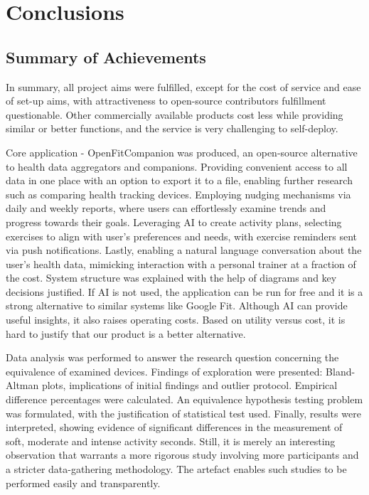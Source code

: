 \chapter{Conclusions}
\label{cha:evaluation}
\section{Summary of Achievements}
In summary, all project aims were fulfilled, except for the cost of service and ease of set-up aims, with attractiveness to open-source contributors fulfillment questionable. Other commercially available products cost less while providing similar or better functions, and the service is very challenging to self-deploy.

Core application - OpenFitCompanion was produced, an open-source alternative to health data aggregators and companions. Providing convenient access to all data in one place with an option to export it to a file, enabling further research such as comparing health tracking devices. Employing nudging mechanisms via daily and weekly reports, where users can effortlessly examine trends and progress towards their goals. Leveraging AI to create activity plans, selecting exercises to align with user's preferences and needs, with exercise reminders sent via push notifications. Lastly, enabling a natural language conversation about the user's health data, mimicking interaction with a personal trainer at a fraction of the cost. System structure was explained with the help of diagrams and key decisions justified. If AI is not used, the application can be run for free and it is a strong alternative to similar systems like Google Fit. Although AI can provide useful insights, it also raises operating costs. Based on utility versus cost, it is hard to justify that our product is a better alternative.

Data analysis was performed to answer the research question concerning the equivalence of examined devices. Findings of exploration were presented: Bland-Altman plots, implications of initial findings and outlier protocol. Empirical difference percentages were calculated. An equivalence hypothesis testing problem was formulated, with the justification of statistical test used. Finally, results were interpreted, showing evidence of significant differences in the measurement of soft, moderate and intense activity seconds. Still, it is merely an interesting observation that warrants a more rigorous study involving more participants and a stricter data-gathering methodology. The artefact enables such studies to be performed easily and transparently.
